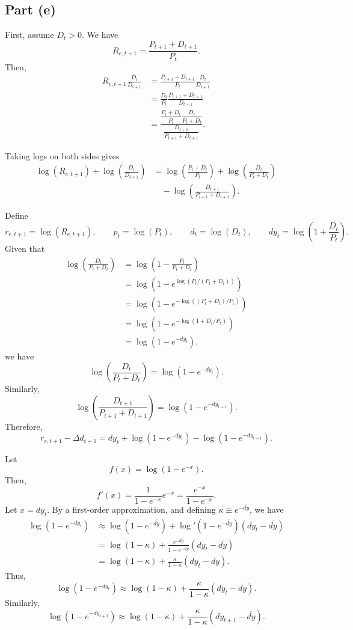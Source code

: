 \documentclass[11pt]{article}
\begin{document}
\subsection{Part (e)}

First, assume $D_t>0$. We have
\[
R_{e,t+1}=\frac{P_{t+1}+D_{t+1}}{P_t}.
\]
Then,
\begin{align*}
R_{e,t+1}\frac{D_t}{D_{t+1}}
&=\frac{P_{t+1}+D_{t+1}}{P_t}\frac{D_t}{D_{t+1}} \\
&=\frac{D_t}{P_t}\frac{P_{t+1}+D_{t+1}}{D_{t+1}} \\
&=\frac{
\dfrac{P_t+D_t}{P_t}\dfrac{D_t}{P_t+D_t}
}{
\dfrac{D_{t+1}}{P_{t+1}+D_{t+1}}
}.
\end{align*}

Taking logs on both sides gives
\begin{align*}
\log(R_{e,t+1})+\log\!\left(\frac{D_t}{D_{t+1}}\right)
&=\log\!\left(\frac{P_t+D_t}{P_t}\right)
+\log\!\left(\frac{D_t}{P_t+D_t}\right) \\
&\quad-\log\!\left(\frac{D_{t+1}}{P_{t+1}+D_{t+1}}\right).
\end{align*}

Define
\[
r_{e,t+1}=\log(R_{e,t+1}),
\qquad p_t=\log(P_t),
\qquad d_t=\log(D_t),
\qquad dy_t=\log\!\left(1+\frac{D_t}{P_t}\right).
\]
Given that
\begin{align*}
\log\!\left(\frac{D_t}{P_t+D_t}\right)
&=\log\!\left(1-\frac{P_t}{P_t+D_t}\right) \\
&=\log\!\left(1-e^{\log(P_t/(P_t+D_t))}\right) \\
&=\log\!\left(1-e^{-\log((P_t+D_t)/P_t)}\right) \\
&=\log\!\left(1-e^{-\log(1+D_t/P_t)}\right) \\
&=\log\!\left(1-e^{-dy_t}\right),
\end{align*}
we have
\[
\log\!\left(\frac{D_t}{P_t+D_t}\right)
=\log\!\left(1-e^{-dy_t}\right).
\]
Similarly,
\[
\log\!\left(\frac{D_{t+1}}{P_{t+1}+D_{t+1}}\right)
=\log\!\left(1-e^{-dy_{t+1}}\right).
\]
Therefore,
\[
r_{e,t+1}-\Delta d_{t+1}
=dy_t+\log\!\left(1-e^{-dy_t}\right)
-\log\!\left(1-e^{-dy_{t+1}}\right).
\]

Let
\[
f(x)=\log(1-e^{-x}).
\]
Then,
\[
f'(x)=\frac{1}{1-e^{-x}}e^{-x}
=\frac{e^{-x}}{1-e^{-x}}.
\]
Let $x=dy_t$. By a first-order approximation, and defining
$\kappa\equiv e^{-\overline{dy}}$, we have
\begin{align*}
\log\!\left(1-e^{-dy_t}\right)
&\approx \log\!\left(1-e^{-\overline{dy}}\right)
+\log'\!\left(1-e^{-\overline{dy}}\right)(dy_t-\overline{dy}) \\
&=\log(1-\kappa)
+\frac{e^{-\overline{dy}}}{1-e^{-\overline{dy}}}
(dy_t-\overline{dy}) \\
&=\log(1-\kappa)+\frac{\kappa}{1-\kappa}
(dy_t-\overline{dy}).
\end{align*}
Thus,
\[
\log\!\left(1-e^{-dy_t}\right)
\approx \log(1-\kappa)+\frac{\kappa}{1-\kappa}
(dy_t-\overline{dy}).
\]
Similarly,
\[
\log\!\left(1-e^{-dy_{t+1}}\right)
\approx \log(1-\kappa)+\frac{\kappa}{1-\kappa}
(dy_{t+1}-\overline{dy}).
\]
\end{document}
